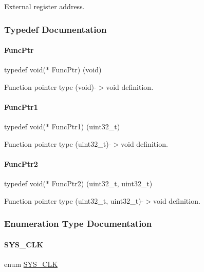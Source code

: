 External register address. 

\subsubsection{Typedef Documentation}
\mbox{\label{a00020_a3d987633d7a3ca10c14905a807b62eb1}} 
\paragraph{\texorpdfstring{Func\+Ptr}{FuncPtr}}
{\footnotesize\ttfamily typedef void($\ast$ Func\+Ptr) (void)}

Function pointer type (void)-\/$>$void definition. \mbox{\label{a00020_a0891965816a5b721b07f7bebefaf7430}} 
\paragraph{\texorpdfstring{Func\+Ptr1}{FuncPtr1}}
{\footnotesize\ttfamily typedef void($\ast$ Func\+Ptr1) (uint32\+\_\+t)}

Function pointer type (uint32\+\_\+t)-\/$>$void definition. \mbox{\label{a00020_a331a88eeefe11112bb8fe1b43dd777b8}} 
\paragraph{\texorpdfstring{Func\+Ptr2}{FuncPtr2}}
{\footnotesize\ttfamily typedef void($\ast$ Func\+Ptr2) (uint32\+\_\+t, uint32\+\_\+t)}

Function pointer type (uint32\+\_\+t, uint32\+\_\+t)-\/$>$void definition. 

\subsubsection{Enumeration Type Documentation}
\mbox{\label{a00020_ae3a2d501b8662e11b969fb4a5e195e5b}} 
\paragraph{\texorpdfstring{S\+Y\+S\+\_\+\+C\+LK}{SYS\_CLK}}
{\footnotesize\ttfamily enum \mbox{\hyperlink{a00020_ae3a2d501b8662e11b969fb4a5e195e5b}{S\+Y\+S\+\_\+\+C\+LK}}}

